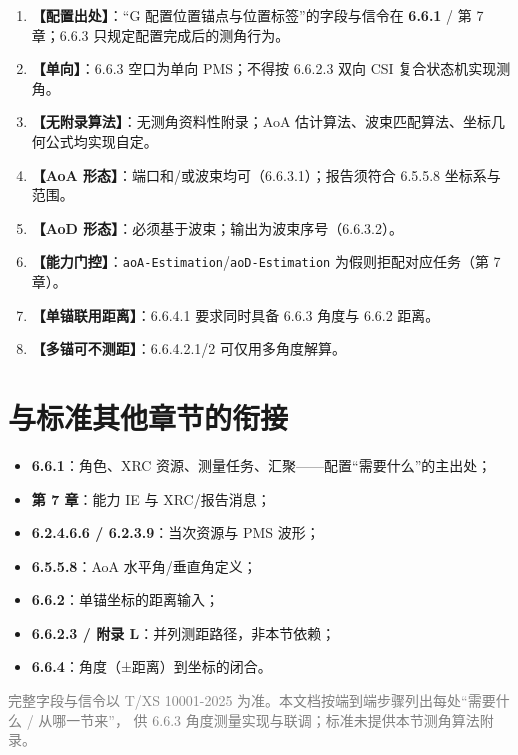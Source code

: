 \documentclass[11pt,a4paper]{ctexart}
\begin{document}
\begin{enumerate}[nosep]
  \item \textbf{【配置出处】}：``G 配置位置锚点与位置标签''的字段与信令在 \textbf{6.6.1} / 第 7 章；6.6.3 只规定配置完成后的测角行为。
  \item \textbf{【单向】}：6.6.3 空口为单向 PMS；不得按 6.6.2.3 双向 CSI 复合状态机实现测角。
  \item \textbf{【无附录算法】}：无测角资料性附录；AoA 估计算法、波束匹配算法、坐标几何公式均实现自定。
  \item \textbf{【AoA 形态】}：端口和/或波束均可（6.6.3.1）；报告须符合 6.5.5.8 坐标系与范围。
  \item \textbf{【AoD 形态】}：必须基于波束；输出为波束序号（6.6.3.2）。
  \item \textbf{【能力门控】}：\texttt{aoA-Estimation}/\texttt{aoD-Estimation} 为假则拒配对应任务（第 7 章）。
  \item \textbf{【单锚联用距离】}：6.6.4.1 要求同时具备 6.6.3 角度与 6.6.2 距离。
  \item \textbf{【多锚可不测距】}：6.6.4.2.1/2 可仅用多角度解算。
\end{enumerate}

\section{与标准其他章节的衔接}

\begin{itemize}[nosep]
  \item \textbf{6.6.1}：角色、XRC 资源、测量任务、汇聚——配置``需要什么''的主出处；
  \item \textbf{第 7 章}：能力 IE 与 XRC/报告消息；
  \item \textbf{6.2.4.6.6 / 6.2.3.9}：当次资源与 PMS 波形；
  \item \textbf{6.5.5.8}：AoA 水平角/垂直角定义；
  \item \textbf{6.6.2}：单锚坐标的距离输入；
  \item \textbf{6.6.2.3 / 附录 L}：并列测距路径，非本节依赖；
  \item \textbf{6.6.4}：角度（±距离）到坐标的闭合。
\end{itemize}

\vfill
\begin{center}
\small\textcolor{gray}{完整字段与信令以 T/XS 10001-2025 为准。本文档按端到端步骤列出每处``需要什么 / 从哪一节来''，
供 6.6.3 角度测量实现与联调；标准未提供本节测角算法附录。}
\end{center}
\end{document}
